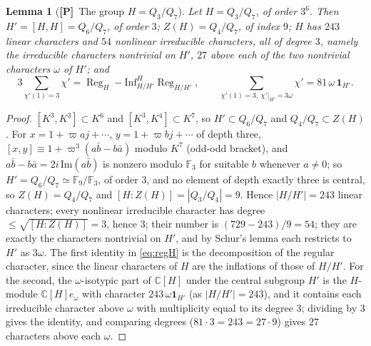\documentclass[11pt]{article}
\newcommand{\C}{\mathbb C}
\newcommand{\Fq}{\mathbb F}
\newcommand{\Reg}{\operatorname{Reg}}
\newcommand{\Ptag}{\textnormal{\textbf{[P]}}}
\theoremstyle{plain}
\newtheorem{lemma}[theorem]{Lemma}
\theoremstyle{definition}
\begin{document}
\begin{lemma}[\Ptag\ The group $H=Q_3/Q_7$]\label{lem:Hstructure}
Let $H=Q_3/Q_7$, of order $3^6$.  Then $H'=[H,H]=Q_6/Q_7$, of order $3$;
$Z(H)=Q_4/Q_7$, of index $9$; $H$ has $243$ linear characters and $54$
nonlinear irreducible characters, all of degree $3$, namely the
irreducible characters nontrivial on $H'$, $27$ above each of the two
nontrivial characters $\omega$ of $H'$; and
\begin{equation}\label{eq:regH}
 3\sum_{\chi'(1)=3}\chi'=\Reg_H-\mathrm{Inf}_{H/H'}^{H}\Reg_{H/H'},\qquad
 \sum_{\chi'(1)=3,\ \chi'|_{H'}=3\omega}\chi'=81\,\omega\,\mathbf 1_{H'} .
\end{equation}
\end{lemma}
\begin{proof}
$[K^3,K^3]\subset K^6$ and $[K^3,K^4]\subset K^7$, so $H'\subset Q_6/Q_7$
and $Q_4/Q_7\subset Z(H)$.  For $x=1+\varpi aj+\cdots$, $y=1+\varpi bj+\cdots$
of depth three, $[x,y]\equiv1+\varpi^3(a\bar b-b\bar a)$ modulo $K^7$
(odd-odd bracket), and $a\bar b-b\bar a=2i\,\mathrm{Im}(a\bar b)$ is
nonzero modulo $\Fq_3$ for suitable $b$ whenever $a\ne0$; so
$H'=Q_6/Q_7\simeq\Fq_9/\Fq_3$, of order $3$, and no element of depth
exactly three is central, so $Z(H)=Q_4/Q_7$ and $[H:Z(H)]=|Q_3/Q_4|=9$.
Hence $|H/H'|=243$ linear characters; every nonlinear irreducible
character has degree $\le\sqrt{[H:Z(H)]}=3$, hence $3$; their number is
$(729-243)/9=54$; they are exactly the characters nontrivial on $H'$,
and by Schur's lemma each restricts to $H'$ as $3\omega$.  The first
identity in \eqref{eq:regH} is the decomposition of the regular
character, since the linear characters of $H$ are the inflations of
those of $H/H'$.  For the second, the $\omega$-isotypic part of $\C[H]$
under the central subgroup $H'$ is the $H$-module $\C[H]e_\omega$ with
character $243\,\omega\mathbf 1_{H'}$ (as $|H/H'|=243$), and it contains
each irreducible character above $\omega$ with multiplicity equal to its
degree $3$; dividing by $3$ gives the identity, and comparing degrees
($81\cdot3=243=27\cdot9$) gives $27$ characters above each $\omega$.
\end{proof}
\end{document}
